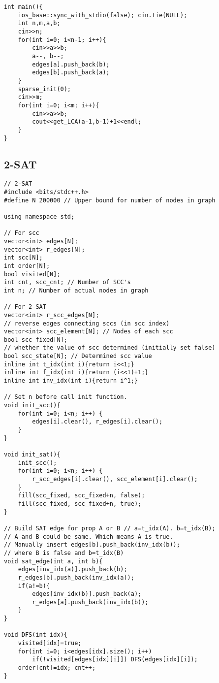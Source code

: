 \documentclass[10pt, landscape]{article}
\begin{document}
\begin{multicols}{2}
\begin{verbatim}
int main(){
    ios_base::sync_with_stdio(false); cin.tie(NULL);
    int n,m,a,b;
    cin>>n;
    for(int i=0; i<n-1; i++){
        cin>>a>>b;
        a--, b--;
        edges[a].push_back(b);
        edges[b].push_back(a);
    }
    sparse_init(0);
    cin>>m;
    for(int i=0; i<m; i++){
        cin>>a>>b;
        cout<<get_LCA(a-1,b-1)+1<<endl;
    }
}   
\end{verbatim}

\subsection{2-SAT}
\begin{verbatim}
// 2-SAT
#include <bits/stdc++.h>
#define N 200000 // Upper bound for number of nodes in graph

using namespace std;

// For scc
vector<int> edges[N]; 
vector<int> r_edges[N];
int scc[N];
int order[N];
bool visited[N];
int cnt, scc_cnt; // Number of SCC's
int n; // Number of actual nodes in graph

// For 2-SAT
vector<int> r_scc_edges[N]; 
// reverse edges connecting sccs (in scc index)
vector<int> scc_element[N]; // Nodes of each scc
bool scc_fixed[N]; 
// whether the value of scc determined (initially set false)
bool scc_state[N]; // Determined scc value 
inline int t_idx(int i){return i<<1;}
inline int f_idx(int i){return (i<<1)+1;}
inline int inv_idx(int i){return i^1;}

// Set n before call init function.
void init_scc(){
    for(int i=0; i<n; i++) {
        edges[i].clear(), r_edges[i].clear();
    }
}

void init_sat(){
    init_scc();
    for(int i=0; i<n; i++) {
        r_scc_edges[i].clear(), scc_element[i].clear();
    }
    fill(scc_fixed, scc_fixed+n, false);
    fill(scc_fixed, scc_fixed+n, true);
}

// Build SAT edge for prop A or B // a=t_idx(A). b=t_idx(B);
// A and B could be same. Which means A is true.  
// Manually insert edges[b].push_back(inv_idx(b)); 
// where B is false and b=t_idx(B)
void sat_edge(int a, int b){
    edges[inv_idx(a)].push_back(b);
    r_edges[b].push_back(inv_idx(a));
    if(a!=b){
        edges[inv_idx(b)].push_back(a);
        r_edges[a].push_back(inv_idx(b));
    }
}

void DFS(int idx){
    visited[idx]=true;
    for(int i=0; i<edges[idx].size(); i++) 
        if(!visited[edges[idx][i]]) DFS(edges[idx][i]);
    order[cnt]=idx; cnt++;
}


\end{verbatim}
\end{multicols}
\end{document}

